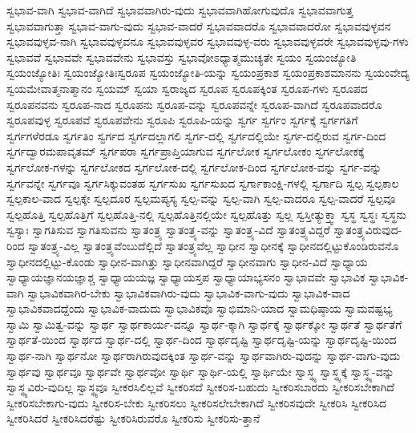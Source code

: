 {ಸ್ವಭಾವ-ವಾಗಿ
ಸ್ವಭಾವ-ವಾಗಿದೆ
ಸ್ವಭಾವವಾಗಿರು-ವುದು
ಸ್ವಭಾವವಾಗಿಹೋಗುವುದೊ
ಸ್ವಭಾವವಾಗುತ್ತ
ಸ್ವಭಾವವಾಗುತ್ತಾ
ಸ್ವಭಾವ-ವಾಗು-ವುದು
ಸ್ವಭಾವ-ವಾದರೆ
ಸ್ವಭಾವವಾದರೊ
ಸ್ವಭಾವವಾದರೋ
ಸ್ವಭಾವವುಳ್ಳವನ
ಸ್ವಭಾವವುಳ್ಳವ-ನಾಗಿ
ಸ್ವಭಾವವುಳ್ಳವನೂ
ಸ್ವಭಾವವುಳ್ಳವರ
ಸ್ವಭಾವವುಳ್ಳ-ವರು
ಸ್ವಭಾವವುಳ್ಳವರೇ
ಸ್ವಭಾವವುಳ್ಳವು-ಗಳು
ಸ್ವಭಾವವೆ
ಸ್ವಭಾವವೇ
ಸ್ವಭಾವವೇನು
ಸ್ವಭಾವಸ್ತು
ಸ್ವಭಾವೋಽಧ್ಯಾತ್ಮಮುಚ್ಯತೇ
ಸ್ವಯಂ
ಸ್ವಯಂಜ್ಯೋತಿ
ಸ್ವಯಂಜ್ಯೋತಿಃ
ಸ್ವಯಂಜ್ಯೋತಿಃಸ್ವರೂಪ
ಸ್ವಯಂಜ್ಯೋತಿ-ಯನ್ನು
ಸ್ವಯಂಪ್ರಕಾಶ
ಸ್ವಯಂಪ್ರಕಾಶಮಾನನು
ಸ್ವಯಂವೇದ್ಯ
ಸ್ವಯಮೇವಾತ್ಮನಾತ್ಮಾನಂ
ಸ್ವಯಮ್
ಸ್ವಯಾ
ಸ್ವರಾಜ್ಯದ
ಸ್ವರೂಪ
ಸ್ವರೂಪಕ್ಕಿಂತ
ಸ್ವರೂಪ-ಗಳು
ಸ್ವರೂಪದ
ಸ್ವರೂಪನವನು
ಸ್ವರೂಪ-ನಾದ
ಸ್ವರೂಪನು
ಸ್ವರೂಪ-ವನ್ನು
ಸ್ವರೂಪವನ್ನೇ
ಸ್ವರೂಪ-ವಾಗಿದೆ
ಸ್ವರೂಪವಾದರೊ
ಸ್ವರೂಪವುಳ್ಳ
ಸ್ವರೂಪವೆ
ಸ್ವರೂಪವೇನು
ಸ್ವರೂಪಿ
ಸ್ವರೂಪಿ-ಯನ್ನು
ಸ್ವರ್ಗ
ಸ್ವರ್ಗಂ
ಸ್ವರ್ಗಕ್ಕೆ
ಸ್ವರ್ಗಗತಿಗೆ
ಸ್ವರ್ಗಗಳೆರಡೂ
ಸ್ವರ್ಗತಿಂ
ಸ್ವರ್ಗದ
ಸ್ವರ್ಗದಲ್ಲಾಗಲಿ
ಸ್ವರ್ಗ-ದಲ್ಲಿ
ಸ್ವರ್ಗದಲ್ಲಿಯೇ
ಸ್ವರ್ಗ-ದಲ್ಲಿರುವ
ಸ್ವರ್ಗ-ದಿಂದ
ಸ್ವರ್ಗದ್ವಾರಮಪಾವೃತಮ್
ಸ್ವರ್ಗಪರಾ
ಸ್ವರ್ಗಪ್ರಾಪ್ತಿಯಾಗುವ
ಸ್ವರ್ಗಲೋಕ
ಸ್ವರ್ಗಲೋಕಂ
ಸ್ವರ್ಗಲೋಕಕ್ಕೆ
ಸ್ವರ್ಗಲೋಕ-ಗಳನ್ನು
ಸ್ವರ್ಗಲೋಕದ
ಸ್ವರ್ಗಲೋಕ-ದಲ್ಲಿ
ಸ್ವರ್ಗಲೋಕ-ದಿಂದ
ಸ್ವರ್ಗಲೋಕ-ವನ್ನು
ಸ್ವರ್ಗ-ವನ್ನು
ಸ್ವರ್ಗವನ್ನೇ
ಸ್ವರ್ಗವೂ
ಸ್ವರ್ಗಸಿಕ್ಕುವಂತಹ
ಸ್ವರ್ಗಸುಖ
ಸ್ವರ್ಗಸುಖದ
ಸ್ವರ್ಗಾಕಾಂಕ್ಷಿ-ಗಳಲ್ಲಿ
ಸ್ವರ್ಗಾದಿ
ಸ್ವಲ್ಪ
ಸ್ವಲ್ಪಕಾಲ
ಸ್ವಲ್ಪಕಾಲ-ವಾದ
ಸ್ವಲ್ಪಕ್ಕೇ
ಸ್ವಲ್ಪದೂರ
ಸ್ವಲ್ಪಮಪ್ಯಸ್ಯ
ಸ್ವಲ್ಪ-ವನ್ನು
ಸ್ವಲ್ಪ-ವಾಗಿ
ಸ್ವಲ್ಪ-ವಾದರೂ
ಸ್ವಲ್ಪ-ವಾದರೆ
ಸ್ವಲ್ಪವೂ
ಸ್ವಲ್ಪಹೊತ್ತಿ
ಸ್ವಲ್ಪಹೊತ್ತಿಗೆ
ಸ್ವಲ್ಪಹೊತ್ತಿ-ನಲ್ಲಿ
ಸ್ವಲ್ಪಹೊತ್ತಿನಲ್ಲಿಯೇ
ಸ್ವಲ್ಪಹೊತ್ತು
ಸ್ವಲ್ಲ
ಸ್ವಸ್ತೀತ್ಯುಕ್ತ್ವಾ
ಸ್ವಸ್ಥ
ಸ್ವಸ್ಥಃ
ಸ್ವಸ್ಥನು
ಸ್ವಸ್ಯಾಃ
ಸ್ವಾಗತಿಸುವ
ಸ್ವಾಗತಿಸುವನು
ಸ್ವಾತಂತ್ರ್ಯ
ಸ್ವಾತಂತ್ರ್ಯ-ವನ್ನು
ಸ್ವಾತಂತ್ರ್ಯ-ವಿದೆ
ಸ್ವಾತಂತ್ರ್ಯವಿದ್ದರೆ
ಸ್ವಾತಂತ್ರ್ಯವಿರುವುದ-ರಿಂದ
ಸ್ವಾತಂತ್ರ್ಯ-ವಿಲ್ಲ
ಸ್ವಾತಂತ್ರ್ಯವೆಂಬುದೆಲ್ಲಿದೆ
ಸ್ವಾತಂತ್ರ್ಯವೆಲ್ಲ
ಸ್ವಾಧೀನ
ಸ್ವಾಧೀನಕ್ಕೆ
ಸ್ವಾಧೀನದಲ್ಲಿಟ್ಟುಕೊಂಡಿರುವನೊ
ಸ್ವಾಧೀನದಲ್ಲಿಟ್ಟು-ಕೊಂಡು
ಸ್ವಾಧೀನ-ವಾಗಿತ್ತು
ಸ್ವಾಧೀನವಾಗಿದ್ದರೆ
ಸ್ವಾಧೀನವಾಗು
ಸ್ವಾಧೀನ-ವಿದೆ
ಸ್ವಾಧ್ಯಾಯ
ಸ್ವಾಧ್ಯಾಯಜ್ಞಾನಯಜ್ಞಾಶ್ಚ
ಸ್ವಾಧ್ಯಾಯಯಜ್ಞ
ಸ್ವಾಧ್ಯಾಯಸ್ತಪ
ಸ್ವಾಧ್ಯಾಯಾಭ್ಯಸನಂ
ಸ್ವಾಭಾವವೇ
ಸ್ವಾಭಾವಿಕ
ಸ್ವಾಭಾವಿಕ-ವಾಗಿ
ಸ್ವಾಭಾವಿಕವಾಗಿರ-ಬೇಕು
ಸ್ವಾಭಾವಿಕವಾಗಿರು-ವುದು
ಸ್ವಾಭಾವಿಕ-ವಾಗು-ವುದು
ಸ್ವಾಭಾವಿಕ-ವಾದ
ಸ್ವಾಭಾವಿಕವಾದದ್ದೆಂದು
ಸ್ವಾಭಾವಿಕ-ವಾದುದು
ಸ್ವಾಭಾವಿಕವೊ
ಸ್ವಾಭಿಮಾನಿ-ಯಾದ
ಸ್ವಾಮಧಿಷ್ಠಾಯ
ಸ್ವಾಮವಷ್ಟಭ್ಯ
ಸ್ವಾಮಿ
ಸ್ವಾಮಿತ್ವ-ವನ್ನು
ಸ್ವಾರ್ಥ
ಸ್ವಾರ್ಥಕಾರ್ಯ-ವನ್ನೂ
ಸ್ವಾರ್ಥ-ಕ್ಕಾಗಿ
ಸ್ವಾರ್ಥಕ್ಕೆ
ಸ್ವಾರ್ಥಕ್ಕೋ
ಸ್ವಾರ್ಥತೆ
ಸ್ವಾರ್ಥತೆಗೆ
ಸ್ವಾರ್ಥತೆ-ಯಿಂದ
ಸ್ವಾರ್ಥದ
ಸ್ವಾರ್ಥ-ದಲ್ಲಿ
ಸ್ವಾರ್ಥ-ದಿಂದ
ಸ್ವಾರ್ಥದೃಷ್ಟಿ
ಸ್ವಾರ್ಥದೃಷ್ಟಿ-ಯನ್ನು
ಸ್ವಾರ್ಥದೃಷ್ಟಿ-ಯಿಂದ
ಸ್ವಾರ್ಥ-ನಾಗಿ
ಸ್ವಾರ್ಥನೋ
ಸ್ವಾರ್ಥರಾಗಿರುವುದಕ್ಕಿಂತ
ಸ್ವಾರ್ಥ-ವನ್ನು
ಸ್ವಾರ್ಥವಾಗಿರು-ವುದನ್ನು
ಸ್ವಾರ್ಥ-ವಾಗು-ವುದು
ಸ್ವಾರ್ಥವು
ಸ್ವಾರ್ಥವೂ
ಸ್ವಾರ್ಥವೇ
ಸ್ವಾರ್ಥವೋ
ಸ್ವಾರ್ಥಿ
ಸ್ವಾರ್ಥಿ-ಯಲ್ಲಿ
ಸ್ವಾರ್ಥಿಯೇ
ಸ್ವಾಸ್ಥ್ಯ
ಸ್ವಾಸ್ಥ್ಯಕ್ಕೆ
ಸ್ವಾಸ್ಥ್ಯ-ವನ್ನು
ಸ್ವಾಸ್ಥ್ಯವಿರು-ವುದಿಲ್ಲ
ಸ್ವಾಸ್ಥ್ಯವೂ
ಸ್ವೀಕರಸಿಲಿಲ್ಲವೆ
ಸ್ವೀಕರಿಸದೆ
ಸ್ವೀಕರಿಸ-ಬಹುದು
ಸ್ವೀಕರಿಸಬಾರದು
ಸ್ವೀಕರಿಸಬೇಕಾಗಿದೆ
ಸ್ವೀಕರಿಸಬೇಕಾಗು-ವುದು
ಸ್ವೀಕರಿಸ-ಬೇಕು
ಸ್ವೀಕರಿಸಲು
ಸ್ವೀಕರಿಸಲೇಬೇಕಾಗಿದೆ
ಸ್ವೀಕರಿಸವುದೇ
ಸ್ವೀಕರಿಸಿ
ಸ್ವೀಕರಿಸಿದ
ಸ್ವೀಕರಿಸಿದರೆ
ಸ್ವೀಕರಿಸಿದರೆಷ್ಟು
ಸ್ವೀಕರಿಸಿರುವರೊ
ಸ್ವೀಕರಿಸು
ಸ್ವೀಕರಿಸು-ತ್ತಾನೆ
}
